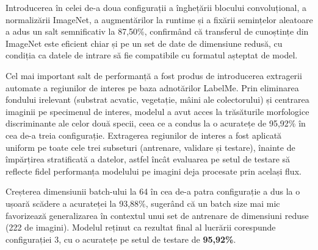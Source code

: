 Introducerea în celei de-a doua configurații a înghețării blocului convoluțional, a normalizării ImageNet, a augmentărilor la runtime și a fixării semințelor aleatoare a adus un salt semnificativ la 87,50\%, confirmând că transferul de cunoștințe din ImageNet este eficient chiar și pe un set de date de dimensiune redusă, cu condiția ca datele de intrare să fie compatibile cu formatul așteptat de model.

Cel mai important salt de performanță a fost produs de introducerea extragerii automate a regiunilor de interes pe baza adnotărilor LabelMe. Prin eliminarea fondului irelevant (substrat acvatic, vegetație, mâini ale colectorului) și centrarea imaginii pe specimenul de interes, modelul a avut acces la trăsăturile morfologice discriminante ale celor două specii, ceea ce a condus la o acuratețe de 95,92\% în cea de-a treia configurație. Extragerea regiunilor de interes a fost aplicată uniform pe toate cele trei subseturi (antrenare, validare și testare), înainte de împărțirea stratificată a datelor, astfel încât evaluarea pe setul de testare să reflecte fidel performanța modelului pe imagini deja procesate prin același flux.

Creșterea dimensiunii batch-ului la 64 în cea de-a patra configurație a dus la o ușoară scădere a acurateței la 93,88\%, sugerând că un batch size mai mic favorizează generalizarea în contextul unui set de antrenare de dimensiuni reduse (222 de imagini). Modelul reținut ca rezultat final al lucrării corespunde configurației 3, cu o acuratețe pe setul de testare de \textbf{95,92\%}.


